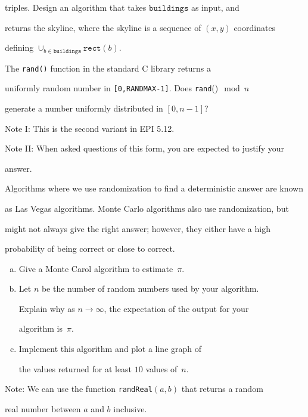 \documentclass{article}
\begin{document}
triples. Design an algorithm that takes $\mathtt{buildings}$ as input, and

returns the skyline, where the skyline is a sequence of $(x,y)$ coordinates

defining $\cup_{b \in \mathtt{buildings}} \mathtt{rect}(b)$.



\nextprob

The \texttt{rand()} function in the standard C library returns a

uniformly random number in \texttt{[0,RANDMAX-1]}. Does \texttt{rand}()$\mod n$

generate a number uniformly distributed in $[0,n-1]$?



Note I: This is the second variant in EPI 5.12.



Note II: When asked questions of this form, you are expected to justify your

answer.



\nextprob



Algorithms where we use randomization to find a deterministic answer are known

as Las Vegas algorithms.  Monte Carlo algorithms also use randomization, but

might not always give the right answer; however, they either have a high

probability of being correct or close to correct.



\begin{enumerate}[(a)]

    \item Give a Monte Carol algorithm to estimate~$\pi$.

    \item Let $n$ be the number of random numbers used by your algorithm.

        Explain why as $n \to \infty$, the expectation of the output for your

        algorithm is~$\pi$.

    \item Implement this algorithm and plot a line graph of

        the values returned for at least $10$ values of~$n$.

\end{enumerate}



Note: We can use the function \texttt{randReal}$(a,b)$ that returns a random

real number between $a$ and $b$ inclusive.
\end{document}
